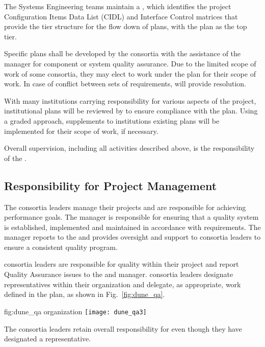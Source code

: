 The  Systems Engineering teams maintain a
 , which identifies the  project
Configuration Items Data List (CIDL) and Interface Control matrices
that provide the tier structure for the flow down of  plans,
with the   plan as the top tier.

Specific  plans shall be developed by the consortia with the
assistance of the   manager for
component or system quality assurance. Due to the limited scope of
work of some consortia, they may elect to work under the
  plan for their scope of work. In
case of conflict between sets of  requirements, 
 will provide resolution.

With many institutions carrying responsibility for various aspects of
the project, institutional  plans will be reviewed by
  to ensure compliance with the
  plan. Using a graded approach,
supplements to institutions existing plans will be implemented for
their  scope of work, if necessary.

Overall  supervision, including all activities described
above, is the responsibility of the  .

\subsection{Responsibility for Project Management}

The  consortia leaders manage their projects and are
responsible for achieving performance goals. The
  manager is responsible for
ensuring that a quality system is established, implemented and
maintained in accordance with requirements. The
  manager reports to the
  and provides oversight and support to
consortia leaders to ensure a consistent quality program.

 consortia leaders are responsible for quality within
their project and report Quality Assurance issues to the 
 and  
manager.  consortia leaders designate 
representatives within their organization and delegate, as appropriate, 
work defined in the   plan, as
shown in Fig.~\ref{fig:dune_qa}.
\begin{dunefigure}{fig:dune_qa}
  {  organization}
  \texttt{[image: dune\_qa3]}
\end{dunefigure}
The  consortia leaders retain overall responsibility for
 even though they have designated a 
representative.

